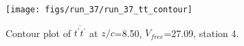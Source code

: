 \begin{figure}[H]
\centering
\texttt{[image: figs/run\_37/run\_37\_tt\_contour]}
\caption{Contour plot of $\overline{t^\prime t^\prime}$ at $z/c$=8.50, $V_{free}$=27.09, station 4.}
\label{fig:run_37_tt_contour}
\end{figure}


